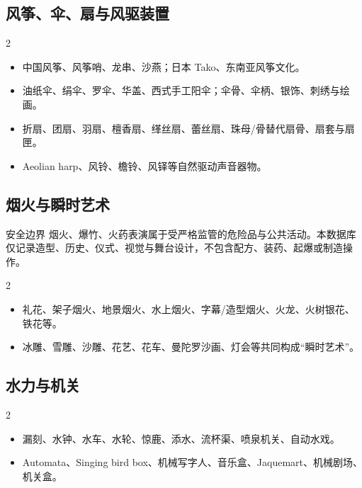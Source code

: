 \documentclass[lang=en,a4paper,11pt]{elegantpaper}
\begin{document}
\subsection{风筝、伞、扇与风驱装置}


\begin{multicols}{2}
\begin{itemize}
\item 中国风筝、风筝哨、龙串、沙燕；日本 Tako、东南亚风筝文化。
\item 油纸伞、绢伞、罗伞、华盖、西式手工阳伞；伞骨、伞柄、银饰、刺绣与绘画。
\item 折扇、团扇、羽扇、檀香扇、缂丝扇、蕾丝扇、珠母/骨替代扇骨、扇套与扇匣。
\item Aeolian harp、风铃、檐铃、风铎等自然驱动声音器物。
\end{itemize}
\end{multicols}

\subsection{烟火与瞬时艺术}


\begin{legalbox}{安全边界}
烟火、爆竹、火药表演属于受严格监管的危险品与公共活动。本数据库仅记录造型、历史、仪式、视觉与舞台设计，不包含配方、装药、起爆或制造操作。
\end{legalbox}

\begin{multicols}{2}
\begin{itemize}
\item 礼花、架子烟火、地景烟火、水上烟火、字幕/造型烟火、火龙、火树银花、铁花等。
\item 冰雕、雪雕、沙雕、花艺、花车、曼陀罗沙画、灯会等共同构成“瞬时艺术”。
\end{itemize}
\end{multicols}

\subsection{水力与机关}


\begin{multicols}{2}
\begin{itemize}
\item 漏刻、水钟、水车、水轮、惊鹿、添水、流杯渠、喷泉机关、自动水戏。
\item Automata、Singing bird box、机械写字人、音乐盒、Jaquemart、机械剧场、机关盒。
\end{itemize}
\end{multicols}
\end{document}
